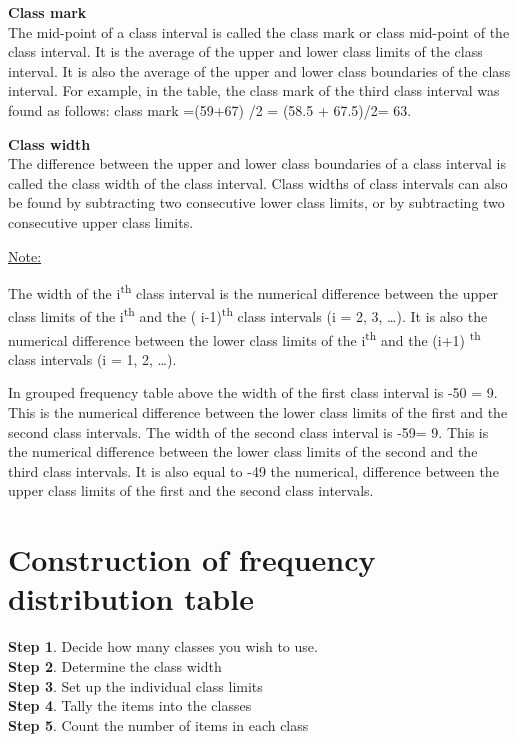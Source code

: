 \documentclass[
]{book}
\begin{document}
\textbf{Class mark}\\
The mid-point of a class interval is called the class mark or class
mid-point of the class interval. It is the average of the upper and
lower class limits of the class interval. It is also the average of the
upper and lower class boundaries of the class interval. For example, in
the table, the class mark of the third class interval was found as
follows: class mark =(59+67) /2 = (58.5 + 67.5)/2= 63.

\textbf{Class width}\\
The difference between the upper and lower class boundaries of a class
interval is called the class width of the class interval. Class widths
of class intervals can also be found by subtracting two consecutive
lower class limits, or by subtracting two consecutive upper class
limits.

\uline{Note:}

The width of the i\textsuperscript{th} class interval is the numerical difference
between the upper class limits of the i\textsuperscript{th} and the ( i-1)\textsuperscript{th} class
intervals (i = 2, 3, \ldots). It is also the numerical difference between
the lower class limits of the i\textsuperscript{th} and the (i+1) \textsuperscript{th} class intervals
(i = 1, 2, \ldots).

In grouped frequency table above the width of the first class interval
is -50\textbar{} = 9. This is the numerical difference between the lower
class limits of the first and the second class intervals. The width of
the second class interval is -59\textbar= 9. This is the numerical
difference between the lower class limits of the second and the third
class intervals. It is also equal to -49\textbar{} the numerical, difference
between the upper class limits of the first and the second class
intervals.

\hypertarget{construction-of-frequency-distribution-table}{%
\section{Construction of frequency distribution table}\label{construction-of-frequency-distribution-table}}

\textbf{Step 1}. Decide how many classes you wish to use.\\
\textbf{Step 2}. Determine the class width\\
\textbf{Step 3}. Set up the individual class limits\\
\textbf{Step 4}. Tally the
items into the classes\\
\textbf{Step 5}. Count the number of items in each class
\end{document}

